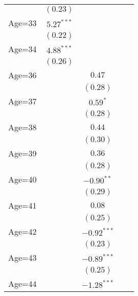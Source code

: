 \documentclass[fullpage]{paper}
\begin{document}
\begin{center}
\begin{longtable}{l c c c c }
            & $(0.23)$      &               &               &               \\
Age=33      & $5.27^{***}$  &               &               &               \\
            & $(0.22)$      &               &               &               \\
Age=34      & $4.88^{***}$  &               &               &               \\
            & $(0.26)$      &               &               &               \\
Age=36      &               & $0.47$        &               &               \\
            &               & $(0.28)$      &               &               \\
Age=37      &               & $0.59^{*}$    &               &               \\
            &               & $(0.28)$      &               &               \\
Age=38      &               & $0.44$        &               &               \\
            &               & $(0.30)$      &               &               \\
Age=39      &               & $0.36$        &               &               \\
            &               & $(0.28)$      &               &               \\
Age=40      &               & $-0.90^{**}$  &               &               \\
            &               & $(0.29)$      &               &               \\
Age=41      &               & $0.08$        &               &               \\
            &               & $(0.25)$      &               &               \\
Age=42      &               & $-0.92^{***}$ &               &               \\
            &               & $(0.23)$      &               &               \\
Age=43      &               & $-0.89^{***}$ &               &               \\
            &               & $(0.25)$      &               &               \\
Age=44      &               & $-1.28^{***}$ &               &               \\

\end{longtable}
\end{center}
\end{document}
